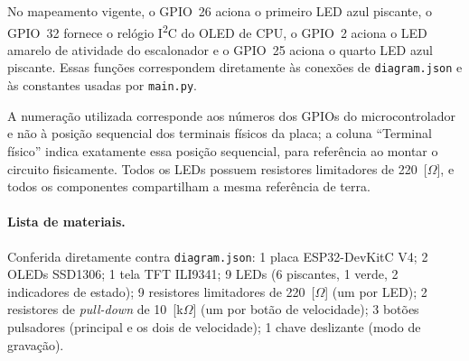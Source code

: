 \documentclass[12pt,a4paper]{article}
\begin{document}
No mapeamento vigente, o GPIO~26 aciona o primeiro LED azul piscante, o GPIO~32 fornece o relógio I\textsuperscript{2}C do OLED de CPU, o GPIO~2 aciona o LED amarelo de atividade do escalonador e o GPIO~25 aciona o quarto LED azul piscante. Essas funções correspondem diretamente às conexões de \texttt{diagram.json} e às constantes usadas por \texttt{main.py}.

A numeração utilizada corresponde aos números dos GPIOs do microcontrolador e não à posição sequencial dos terminais físicos da placa; a coluna \enquote{Terminal físico} indica exatamente essa posição sequencial, para referência ao montar o circuito fisicamente. Todos os LEDs possuem resistores limitadores de 220~[$\Omega$], e todos os componentes compartilham a mesma referência de terra.

\paragraph{Lista de materiais.} Conferida diretamente contra \texttt{diagram.json}: 1 placa ESP32-DevKitC V4; 2 OLEDs SSD1306; 1 tela TFT ILI9341; 9 LEDs (6 piscantes, 1 verde, 2 indicadores de estado); 9 resistores limitadores de 220~[$\Omega$] (um por LED); 2 resistores de \textit{pull-down} de 10~[k$\Omega$] (um por botão de velocidade); 3 botões pulsadores (principal e os dois de velocidade); 1 chave deslizante (modo de gravação).
\end{document}
